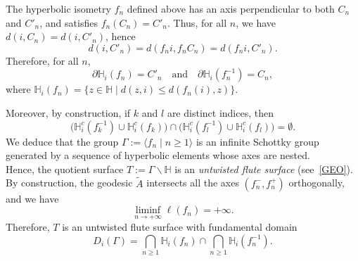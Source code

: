 \documentclass[11pt]{amsart}
\begin{document}
The hyperbolic isometry $f_n$ defined above has an axis perpendicular to both $C_n$ and $C'_n$, and satisfies $f_n(C_n) = C'_n$. 
Thus, for all $n$, we have $d(i, C_n) = d(i, C'_n)$, hence
\[
d(i, C'_n) = d(f_n i, f_n C_n) = d(f_n i, C'_n).
\]
Therefore, for all $n$,
\[
\partial \mathbb{H}_i(f_n) = C'_n
\quad \text{and} \quad
\partial \mathbb{H}_i(f_n^{-1}) = C_n,
\]
where $\mathbb{H}_i(f_n) = \{ z \in \mathbb{H} \mid d(z, i) \leq d(f_n(i), z) \}.$

Moreover, by construction, if $k$ and $l$ are distinct indices, then
\[
\big( \mathbb{H}_i^c(f_k^{-1}) \cup \mathbb{H}_i^c(f_k) \big)
\cap
\big( \mathbb{H}_i^c(f_l^{-1}) \cup \mathbb{H}_i^c(f_l) \big)
= \emptyset.
\]
We deduce that the group $\Gamma := \langle f_n \mid n \geq 1 \rangle$ is an infinite Schottky group generated by a sequence of hyperbolic elements whose axes are nested.\\
Hence, the quotient surface $T := \Gamma \backslash \mathbb{H}$ is an \emph{untwisted flute surface} (see~\ref{GEO}).\\
By construction, the geodesic $\tilde{A}$ intersects all the axes $\left(f_n^-, f_n^+\right)$ orthogonally, and we have
\[
\liminf_{n \to +\infty} \ell(f_n) = +\infty.
\]
Therefore, $T$ is an untwisted flute surface with fundamental domain
\[
D_i(\Gamma) = \bigcap_{n \geq 1} \mathbb{H}_i(f_n) \cap \bigcap_{n \geq 1} \mathbb{H}_i(f_n^{-1}).
\]
\end{document}
